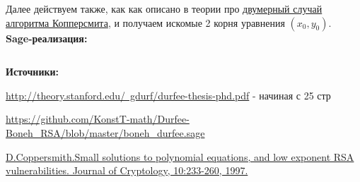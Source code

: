 \documentclass[12pt,a4paper]{scrartcl}
\begin{document}
Далее действуем также, как как описано в теории про \href{https://yatb.kksctf.ru/}{двумерный случай алгоритма Копперсмита}, и получаем искомые 2 корня уравнения $(x_0,y_0)$.\\

\textbf{Sage-реализация:}

\inputminted[tabsize=4,obeytabs,fontsize=\footnotesize]{python3}{./RSA_scripts/two_paddings.sage}

\textbf{Источники:}

\href{http://theory.stanford.edu/~gdurf/durfee-thesis-phd.pdf}{http://theory.stanford.edu/~gdurf/durfee-thesis-phd.pdf} - начиная с 25 стр

\href{https://github.com/KonstT-math/Durfee-Boneh_RSA/blob/master/boneh_durfee.sage}{https://github.com/KonstT-math/Durfee-Boneh\_RSA/blob/master/boneh\_durfee.sage}

\href{https://www.di.ens.fr/~fouque/ens-rennes/coppersmith.pdf}{D.Coppersmith.Small solutions to polynomial equations, and low exponent RSA vulnerabilities. Journal of Cryptology, 10:233-260, 1997.}
\end{document}
